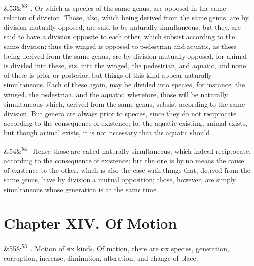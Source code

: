 \documentclass[12pt]{article}
\newcommand{\para}[1][]{\par\noindent\ifx&#1&\else\textsuperscript{\footnotesize #1}~\fi}
\begin{document}
\para[53] 2. Or which as species of the same genus, are opposed in the same relation of division. Those, also, which being derived from the same genus, are by division mutually opposed, are said to be naturally simultaneous; but they, are said to have a division opposite to each other, which subsist according to the same division; thus the winged is opposed to pedestrian and aquatic, as these being derived from the same genus, are by division mutually opposed, for animal is divided into these, viz. into the winged, the pedestrian, and aquatic, and none of these is prior or posterior, but things of this kind appear naturally simultaneous. Each of these again, may be divided into species, for instance, the winged, the pedestrian, and the aquatic; wherefore, those will be naturally simultaneous which, derived from the same genus, subsist according to the same division. But genera are always prior to species, since they do not reciprocate according to the consequence of existence; for the aquatic existing, animal exists, but though animal exists, it is not necessary that the aquatic should.

\para[54] Hence those are called naturally simultaneous, which indeed reciprocate, according to the consequence of existence; but the one is by no means the cause of existence to the other, which is also the case with things that, derived from the same genus, have by division a mutual opposition; those, however, are simply simultaneous whose generation is at the same time.

\section*{Chapter XIV. Of Motion}

\para[55] 1. Motion of six kinds. Of motion, there are six species, generation, corruption, increase, diminution, alteration, and change of place.
\end{document}
